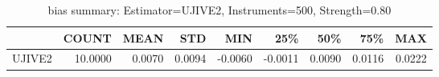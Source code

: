 \begin{table}[ht]
\centering
\caption{bias summary: Estimator=UJIVE2, Instruments=500, Strength=0.80}
\begin{tabular}{lrrrrrrrr}
\toprule
 & COUNT & MEAN & STD & MIN & 25\% & 50\% & 75\% & MAX \\
\midrule
UJIVE2 & 10.0000 & 0.0070 & 0.0094 & -0.0060 & -0.0011 & 0.0090 & 0.0116 & 0.0222 \\
\bottomrule
\end{tabular}
\end{table}
